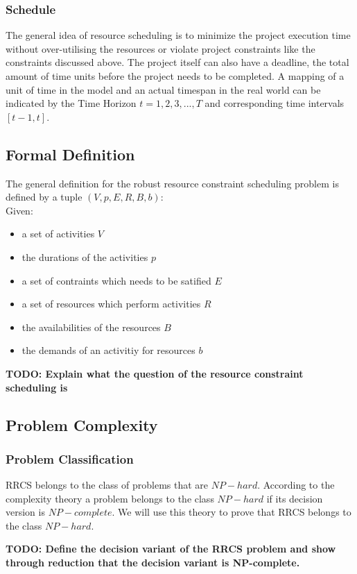 \documentclass{article}
\newcommand{\TODO}[1]{{\color{red}\textbf{TODO: #1}}}
\begin{document}
\subsubsection{Schedule}
The general idea of resource scheduling is to minimize the project execution time without over-utilising the resources or violate project constraints like the constraints discussed above. The project itself can also have a deadline, the total amount of time units before the project needs to be completed. A mapping of a unit of time in the model and an actual timespan in the real world can be indicated by the Time Horizon $t=1,2,3,. . .,T$ and corresponding time intervals $[t-1,t]$. 

\subsection{Formal Definition}
The general definition for the robust resource constraint scheduling problem is defined by a tuple $(V, p, E,R,B, b)$:\\

Given:
\begin{itemize}
\item a set of activities $V$
\item the durations of the activities $p$
\item a set of contraints which needs to be satified $E$
\item a set of resources which perform activities $R$
\item the availabilities of the resources $B$
\item the demands of an activitiy for resources $b$
\end{itemize}

\TODO{Explain what the question of the resource constraint scheduling is}


\subsection{Problem Complexity}
\subsubsection{Problem Classification}
RRCS belongs to the class of problems that are $NP-hard$. According to the complexity theory a problem belongs to the class $NP-hard$ if its decision version is $NP-complete$. We will use this theory to prove that RRCS belongs to the class $NP-hard$.

\TODO{Define the decision variant of the RRCS problem and show through reduction that the decision variant is NP-complete.}
\end{document}
